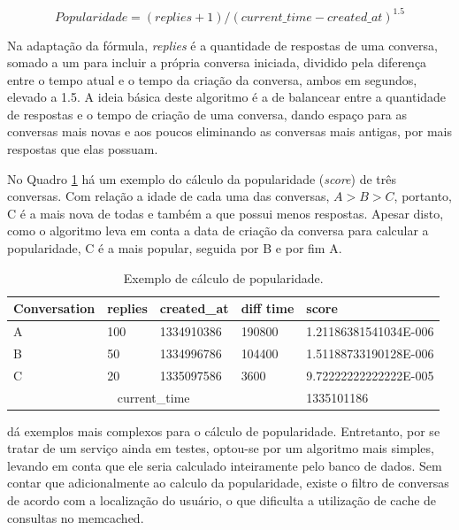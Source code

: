 \documentclass[diss]{template/setrem}
\begin{document}
\begin{equation}
\label{eq:popularidadeadaptada}
Popularidade = (replies + 1)/(current\_time - created\_at)^{1.5}
\end{equation}

Na adaptação da fórmula, \emph{replies} é a quantidade de respostas de uma conversa, somado a um para incluir a própria conversa iniciada, dividido pela diferença entre o tempo atual e o tempo da criação da conversa, ambos em segundos, elevado a 1.5. A ideia básica deste algoritmo é a de balancear entre a quantidade de respostas e o tempo de criação de uma conversa, dando espaço para as conversas mais novas e aos poucos eliminando as conversas mais antigas, por mais respostas que elas possuam.

No Quadro \ref{tab:popularity-example} há um exemplo do cálculo da popularidade (\emph{score}) de três conversas. Com relação a idade de cada uma das conversas, $A > B > C$, portanto, C é a mais nova de todas e também a que possui menos respostas. Apesar disto, como o algoritmo leva em conta a data de criação da conversa para calcular a popularidade, C é a mais popular, seguida por B e por fim A.

\begin{table}
  \begin{center}
  	\footnotesize
  	\renewcommand{\arraystretch}{1.5}
    \begin{tabular}{| l | l | l | l | l |}
    \hline
	
	\textbf{Conversation} & \textbf{replies} & \textbf{created\_at} & \textbf{diff time} & \textbf{score} \\ \hline
	A & 100 & 1334910386 & 190800 & 1.21186381541034E-006 \\ \hline
	B & 50 & 1334996786 & 104400 & 1.51188733190128E-006 \\ \hline
	C & 20 & 1335097586 & 3600 & 9.72222222222222E-005 \\ \hline
	\multicolumn{4}{|c|}{current\_time} & 1335101186 \\ \hline
	
    \hline
    \end{tabular}
  \end{center}
  
  \caption{Exemplo de cálculo de popularidade.}
  \label{tab:popularity-example}
\end{table}

\citet{Linkibol2010} dá exemplos mais complexos para o cálculo de popularidade. Entretanto, por se tratar de um serviço ainda em testes, optou-se por um algoritmo mais simples, levando em conta que ele seria calculado inteiramente pelo banco de dados. Sem contar que adicionalmente ao calculo da popularidade, existe o filtro de conversas de acordo com a localização do usuário, o que dificulta a utilização de cache de consultas no memcached.
\end{document}

